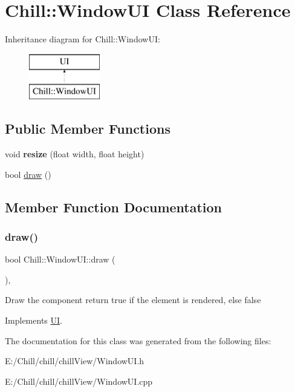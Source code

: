 \hypertarget{class_chill_1_1_window_u_i}{}\section{Chill\+:\+:Window\+UI Class Reference}
\label{class_chill_1_1_window_u_i}
Inheritance diagram for Chill\+:\+:Window\+UI\+:\begin{figure}[H]
\begin{center}
\leavevmode
\includegraphics[height=2.000000cm]{class_chill_1_1_window_u_i}
\end{center}
\end{figure}
\subsection*{Public Member Functions}
\begin{DoxyCompactItemize}
\item 
\mbox{\label{class_chill_1_1_window_u_i_ad1453d889c85b835b68bf7c14e2313e1}} 
void {\bfseries resize} (float width, float height)
\item 
bool \mbox{\hyperlink{class_chill_1_1_window_u_i_ad9d47cd6da5ac14127686b35b4bc4660}{draw}} ()
\end{DoxyCompactItemize}


\subsection{Member Function Documentation}
\mbox{\label{class_chill_1_1_window_u_i_ad9d47cd6da5ac14127686b35b4bc4660}} 
\subsubsection{\texorpdfstring{draw()}{draw()}}
{\footnotesize\ttfamily bool Chill\+::\+Window\+U\+I\+::draw (\begin{DoxyParamCaption}{ }\end{DoxyParamCaption})\hspace{0.3cm}{\ttfamily [inline]}, {\ttfamily [virtual]}}

Draw the component return true if the element is rendered, else false 

Implements \mbox{\hyperlink{class_u_i_a5025b88e26f21852c0cd2e4b42675c50}{UI}}.



The documentation for this class was generated from the following files\+:\begin{DoxyCompactItemize}
\item 
E\+:/\+Chill/chill/chill\+View/Window\+U\+I.\+h\item 
E\+:/\+Chill/chill/chill\+View/Window\+U\+I.\+cpp\end{DoxyCompactItemize}
